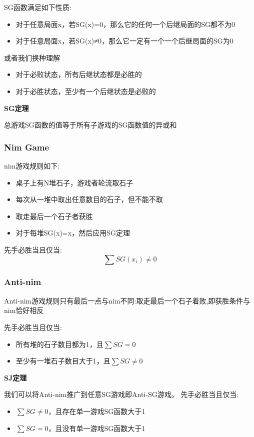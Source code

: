 \documentclass{article}
\begin{document}
SG函数满足如下性质:
\begin{itemize}
\item 对于任意局面x，若SG(x)=0，那么它的任何一个后继局面的SG都不为0
\item 对于任意局面x，若SG(x)≠0，那么它一定有一个一个后继局面的SG为0
\end{itemize}

或者我们换种理解
\begin{itemize}
\item 对于必败状态，所有后继状态都是必胜的
\item 对于必胜状态，至少有一个后继状态是必败的
\end{itemize}


\textbf{SG定理}

总游戏SG函数的值等于所有子游戏的SG函数值的异或和

\subsubsection{Nim Game}

nim游戏规则如下:
\begin{itemize}
\item 桌子上有N堆石子，游戏者轮流取石子
\item 每次从一堆中取出任意数目的石子，但不能不取
\item 取走最后一个石子者获胜
\item 对于每堆SG(x)=x，然后应用SG定理
\end{itemize}

先手必胜当且仅当:
$$\sum SG(x_i) \neq 0$$

\subsubsection{Anti-nim}

Anti-nim游戏规则只有最后一点与nim不同:取走最后一个石子着败,即获胜条件与nim恰好相反

先手必胜当且仅当:
\begin{itemize}
\item 所有堆的石子数目都为1，且$\sum SG = 0$
\item 至少有一堆石子数目大于1，且$\sum SG \neq 0$
\end{itemize}

\textbf{SJ定理}

我们可以将Anti-nim推广到任意SG游戏即Anti-SG游戏。
先手必胜当且仅当:
\begin{itemize}
\item $\sum SG \neq 0$，且存在单一游戏SG函数大于1
\item $\sum SG = 0$，且没有单一游戏SG函数大于1
\end{itemize}
\end{document}
